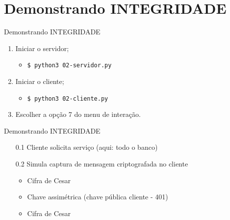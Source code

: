 \documentclass[xcolor=dvipsnames,table]{beamer}
\begin{document}
\section{Demonstrando INTEGRIDADE}
\begin{frame}{Demonstrando INTEGRIDADE}
	\begin{enumerate}
		\item Iniciar o servidor;
		\begin{itemize}
			\item \texttt{\$ python3 02-servidor.py}
		\end{itemize}
		\item Iniciar o cliente;
		\begin{itemize}
			\item \texttt{\$ python3 02-cliente.py}
		\end{itemize}
		\item Escolher a opção 7 do menu de interação.
	\end{enumerate}
\end{frame}

\begin{frame}{Demonstrando INTEGRIDADE}
	\begin{enumerate}
		\item[0.1] Cliente solicita serviço (aqui: todo o banco)
		\item[0.2] Simula captura de mensagem criptografada no cliente
		\begin{itemize}
			\item Cifra de Cesar
			\item Chave assimétrica (chave pública cliente - 401)
			\item Cifra de Cesar
		\end{itemize}
	\end{enumerate}
\end{frame}
\end{document}
